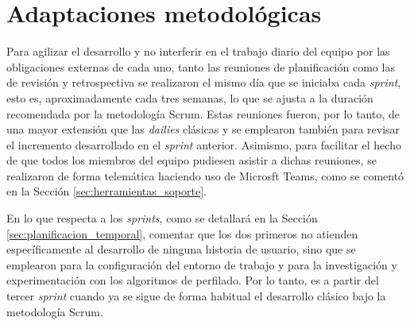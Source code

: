 \section{Adaptaciones metodológicas}
\label{sec:metodologia_eventos}

Para agilizar el desarrollo y no interferir en el trabajo diario del equipo por las obligaciones
externas de cada uno, tanto las reuniones de planificación como las de revisión y retrospectiva se realizaron
el mismo día que se iniciaba cada \textit{sprint}, esto es, aproximadamente cada tres semanas, lo que se ajusta a la duración recomendada
por la metodología Scrum. Estas reuniones fueron, por lo tanto, de una mayor extensión que las \textit{dailies} clásicas y se emplearon también
para revisar el incremento desarrollado en el \textit{sprint} anterior. Asimismo, para facilitar el hecho de que todos los miembros
del equipo pudiesen asistir a dichas reuniones, se realizaron de forma telemática haciendo uso de Microsft Teams, como se comentó en la Sección \ref{sec:herramientas_soporte}.

\bigskip
En lo que respecta a los \textit{sprints}, como se detallará en la Sección \ref{sec:planificacion_temporal}, comentar que los dos primeros
no atienden específicamente al desarrollo de ninguna historia de usuario, sino que se emplearon para la configuración del entorno de trabajo
y para la investigación y experimentación con los algoritmos de perfilado. Por lo tanto, es a partir del tercer \textit{sprint} cuando
ya se sigue de forma habitual el desarrollo clásico bajo la metodología Scrum.
